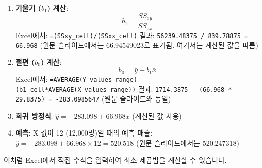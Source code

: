 \documentclass[11pt,a4paper]{book}
\theoremstyle{definition}
\begin{document}
\begin{tcolorbox}[examplebox, title={Excel 실습: 인구 및 매출 데이터}]
\begin{enumerate}[label=\arabic*.]
    \item \textbf{기울기 ($b_1$) 계산}:
    \begin{equation*}
    b_1 = \frac{SS_{xy}}{SS_{xx}}
    \end{equation*}
    Excel에서: \texttt{=(SSxy\_cell)/(SSxx\_cell)}
    결과: \texttt{56239.48375 / 839.78875 = 66.968} (원문 슬라이드에서는 66.94549023로 표기됨. 여기서는 계산된 값을 따름)

    \item \textbf{절편 ($b_0$) 계산}:
    \begin{equation*}
    b_0 = \bar{y} - b_1\bar{x}
    \end{equation*}
    Excel에서: \texttt{=AVERAGE(Y\_values\_range)-(b1\_cell*AVERAGE(X\_values\_range))}
    결과: \texttt{1714.3875 - (66.968 * 29.8375) = -283.0985647} (원문 슬라이드와 동일)

    \item \textbf{회귀 방정식}:
    $\hat{y} = -283.098 + 66.968x$ (계산된 값 사용)

    \item \textbf{예측}: X 값이 12 (12,000명)일 때의 예측 매출:
    $\hat{y} = -283.098 + 66.968 \times 12 = 520.518$ (원문 슬라이드에서는 520.247318)
\end{enumerate}
이처럼 Excel에서 직접 수식을 입력하여 최소 제곱법을 계산할 수 있습니다.


\end{tcolorbox}
\end{document}
